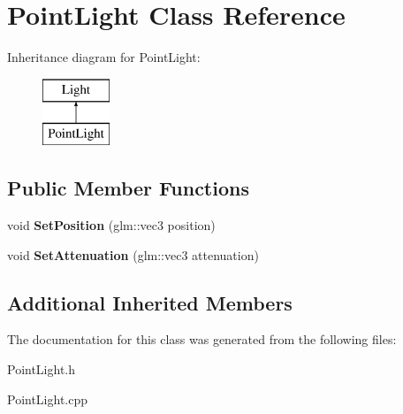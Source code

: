 \hypertarget{class_point_light}{}\section{Point\+Light Class Reference}
\label{class_point_light}
Inheritance diagram for Point\+Light\+:\begin{figure}[H]
\begin{center}
\leavevmode
\includegraphics[height=2.000000cm]{class_point_light}
\end{center}
\end{figure}
\subsection*{Public Member Functions}
\begin{DoxyCompactItemize}
\item 
\hypertarget{class_point_light_a54075ad125124b48c3ae0de94f8846ec}{}void {\bfseries Set\+Position} (glm\+::vec3 position)\label{class_point_light_a54075ad125124b48c3ae0de94f8846ec}

\item 
\hypertarget{class_point_light_a5dee3d9dfd33530fd0b5c4e3caa733a5}{}void {\bfseries Set\+Attenuation} (glm\+::vec3 attenuation)\label{class_point_light_a5dee3d9dfd33530fd0b5c4e3caa733a5}

\end{DoxyCompactItemize}
\subsection*{Additional Inherited Members}


The documentation for this class was generated from the following files\+:\begin{DoxyCompactItemize}
\item 
Point\+Light.\+h\item 
Point\+Light.\+cpp\end{DoxyCompactItemize}
